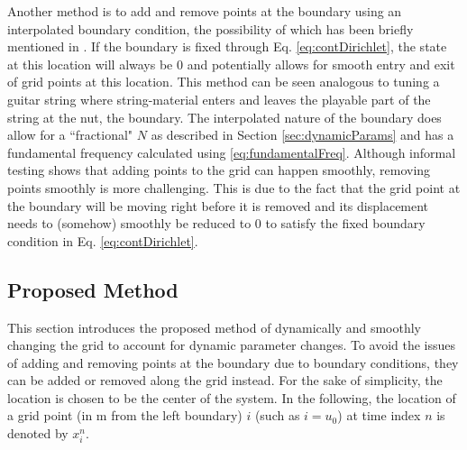 Another method is to add and remove points at the boundary using an interpolated boundary condition, the possibility of which has been briefly mentioned in \cite[p. 145]{bilbao2009}. If the boundary is fixed through Eq. \eqref{eq:contDirichlet}, the state at this location will always be $0$ and potentially allows for smooth entry and exit of grid points at this location. This method can be seen analogous to tuning a guitar string where string-material enters and leaves the playable part of the string at the nut, the boundary. The interpolated nature of the boundary does allow for a ``fractional" $N$ as described in Section \ref{sec:dynamicParams} and has a fundamental frequency calculated using \eqref{eq:fundamentalFreq}. %
Although informal testing shows that adding points to the grid can happen smoothly, removing points smoothly is more challenging. This is due to the fact that the grid point at the boundary will be moving right before it is removed and its displacement needs to (somehow) smoothly be reduced to 0 to satisfy the fixed boundary condition in Eq. \eqref{eq:contDirichlet}. %

\subsection{Proposed Method}\label{sec:proposedMethod}
This section introduces the proposed method of dynamically and smoothly changing the grid to account for dynamic parameter changes. To avoid the issues of adding and removing points at the boundary due to boundary conditions, they can be added or removed along the grid instead. For the sake of simplicity, the location is chosen to be the center of the system. %
In the following, the location of a grid point (in m from the left boundary) $i$ (such as $i = u_0$) at time index $n$ is denoted by $x_i^n$. 

